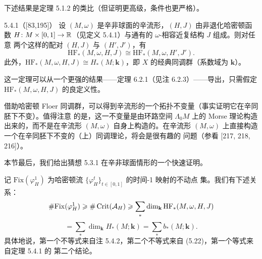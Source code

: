 下述结果是定理 5.1.2 的类比（但证明更高级，条件也更严格）。

\begin{wthm}{5.4.1}（[83,195]）
  设 $(M,\omega)$ 是辛非球面的辛流形，$(H,J)$ 由非退化哈密顿函数
  $H\colon M\times[0,1]\to\mathbb{R}$（见定义 5.4.1）与通有的 $\omega$-相容近复结构 $J$ 组成。则对任意
  两个这样的配对 $(H,J)$ 与 $(H',J')$，有
  \[
    \mathrm{HF}_*(M,\omega,H,J)\cong\mathrm{HF}_*(M,\omega,H',J').
  \]
  此外，$\mathrm{HF}_*(M,\omega,H,J)\cong H_*(M;\mathbf{k})$，即 $X$ 的经典同调群（系数域为
  $\mathbf{k}$）。
\end{wthm}

这一定理可以从一个更强的结果——定理 6.2.1（见注 6.2.3）——导出，只需假定
$\mathrm{HF}_*(M,\omega,H,J)$ 的良定义性。

借助哈密顿 Floer 同调群，可以得到辛流形的一个拓扑不变量（事实证明它在辛同胚下不变）。值得注意
的是，这一不变量是由环路空间 $\Lambda_0M$ 上的 Morse 理论构造出来的，而不是在辛流形 $(M,\omega)$
自身上构造的。在辛流形 $(M,\omega)$ 上直接构造一个在辛同胚下不变的（上）同调理论，将会是很有趣的
问题（参看 [217, 218, 216]）。

本节最后，我们给出猜想 5.3.1 在辛非球面情形的一个快速证明。

\begin{wproof}
  记 $\mathrm{Fix}(\varphi_H^1)$ 为哈密顿流 $\{\varphi_H^t\}_{t\in[0,1]}$ 的时间-1 映射的不动点
  集。我们有下述关系：
  \[
    \#\mathrm{Fix}(\varphi_H^1)\geqslant\#\operatorname{Crit}(\mathcal{A}_H)
      \geqslant\sum_*\dim_{\mathbf{k}}\mathrm{HF}_*(M,\omega,H,J)
  \]
  \[
    =\sum_*\dim_{\mathbf{k}}H_*(M;\mathbf{k})=\sum_*b_*(M;\mathbf{k}).
  \]
  具体地说，第一个不等式来自注 5.4.2，第二个不等式来自 (5.22)，第一个等式来自定理 5.4.1 的
  第二个结论。
\end{wproof}

